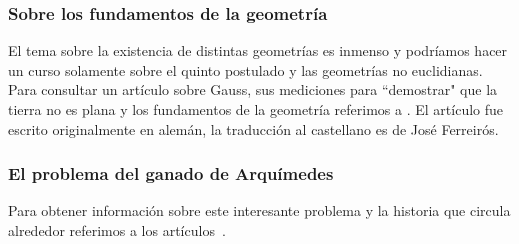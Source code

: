\subsubsection*{Sobre los fundamentos de la geometría}

El tema sobre la existencia de distintas geometrías es inmenso y podríamos
hacer un curso solamente sobre el quinto postulado y las geometrías no euclidianas. 
Para consultar un 
artículo sobre Gauss, sus mediciones para ``demostrar" que la tierra
no es plana y los fundamentos de la geometría
referimos a \cite{scholz_triangulos}. El artículo fue escrito originalmente 
en alemán, la traducción al castellano
es de José Ferreirós.

\subsubsection*{El problema del ganado de Arquímedes}

Para obtener información sobre este interesante problema y la historia
que circula alrededor referimos a
los artículos~\cite{MR1513794,MR1875156,MR1238181,MR1614879,MR1344311}.
